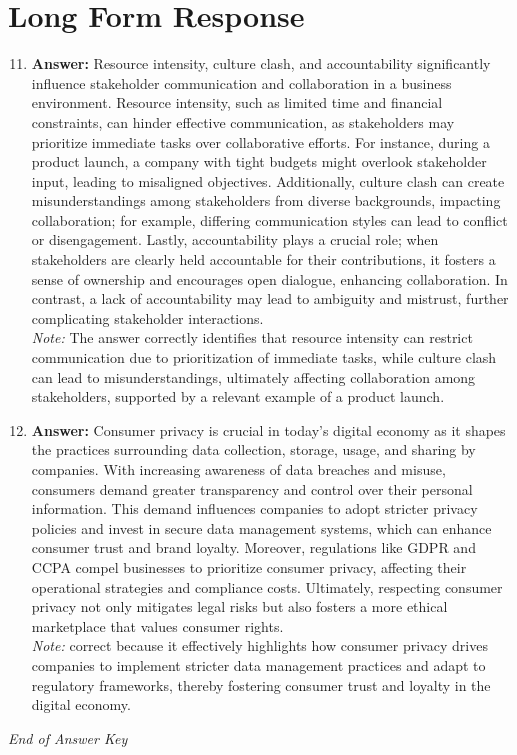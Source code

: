 \documentclass[12pt]{article}
\begin{document}
\section*{Long Form Response}
\begin{enumerate}[label=\arabic*.]
\setcounter{enumi}{10}
\item \textbf{Answer:} Resource intensity, culture clash, and accountability significantly influence stakeholder communication and collaboration in a business environment. Resource intensity, such as limited time and financial constraints, can hinder effective communication, as stakeholders may prioritize immediate tasks over collaborative efforts. For instance, during a product launch, a company with tight budgets might overlook stakeholder input, leading to misaligned objectives. Additionally, culture clash can create misunderstandings among stakeholders from diverse backgrounds, impacting collaboration; for example, differing communication styles can lead to conflict or disengagement. Lastly, accountability plays a crucial role; when stakeholders are clearly held accountable for their contributions, it fosters a sense of ownership and encourages open dialogue, enhancing collaboration. In contrast, a lack of accountability may lead to ambiguity and mistrust, further complicating stakeholder interactions.
\\ \textit{Note:} The answer correctly identifies that resource intensity can restrict communication due to prioritization of immediate tasks, while culture clash can lead to misunderstandings, ultimately affecting collaboration among stakeholders, supported by a relevant example of a product launch.
\item \textbf{Answer:} Consumer privacy is crucial in today's digital economy as it shapes the practices surrounding data collection, storage, usage, and sharing by companies. With increasing awareness of data breaches and misuse, consumers demand greater transparency and control over their personal information. This demand influences companies to adopt stricter privacy policies and invest in secure data management systems, which can enhance consumer trust and brand loyalty. Moreover, regulations like GDPR and CCPA compel businesses to prioritize consumer privacy, affecting their operational strategies and compliance costs. Ultimately, respecting consumer privacy not only mitigates legal risks but also fosters a more ethical marketplace that values consumer rights.
\\ \textit{Note:} correct because it effectively highlights how consumer privacy drives companies to implement stricter data management practices and adapt to regulatory frameworks, thereby fostering consumer trust and loyalty in the digital economy.
\end{enumerate}

\vfill
\noindent\textit{End of Answer Key}
\end{document}
